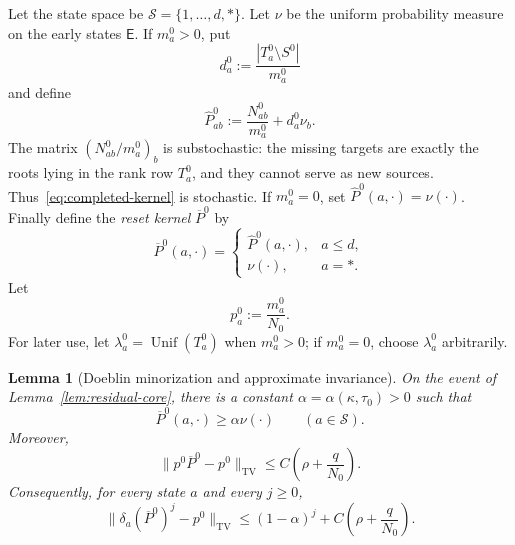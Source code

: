 \documentclass[11pt]{article}
\newcommand{\1}{\mathbf 1}
\newcommand{\TV}{\mathrm{TV}}
\newcommand{\Unif}{\operatorname{Unif}}
\newcommand{\cS}{\mathcal S}
\newtheorem{lemma}[theorem]{Lemma}
\theoremstyle{definition}
\theoremstyle{remark}
\begin{document}
Let the state space be $\cS=\{1,\dots,d,*\}$.  Let $\nu$ be the uniform
probability measure on the early states $\mathsf E$.  If $m_a^0>0$, put
\[
 d_a^0:=\frac{|T_a^0\setminus S^0|}{m_a^0}
\]
and define
\begin{equation}\label{eq:completed-kernel}
  \widehat P^0_{ab}
  :=\frac{N_{ab}^0}{m_a^0}+d_a^0\nu_b.
\end{equation}
The matrix $(N_{ab}^0/m_a^0)_b$ is substochastic: the missing targets are
exactly the roots lying in the rank row $T_a^0$, and they cannot serve as
new sources.  Thus~\eqref{eq:completed-kernel} is stochastic.  If
$m_a^0=0$, set $\widehat P^0(a,\cdot)=\nu(\cdot)$.  Finally define the
\emph{reset kernel} $\overline P^0$ by
\begin{equation}\label{eq:reset-kernel}
  \overline P^0(a,\cdot)=
  \begin{cases}
    \widehat P^0(a,\cdot),&a\leq d,\\
    \nu(\cdot),&a=*.
  \end{cases}
\end{equation}
Let
\begin{equation}\label{eq:p0-def}
  p_a^0:=\frac{m_a^0}{N_0}.
\end{equation}
For later use, let $\lambda_a^0=\Unif(T_a^0)$ when $m_a^0>0$; if
$m_a^0=0$, choose $\lambda_a^0$ arbitrarily.

\begin{lemma}[Doeblin minorization and approximate invariance]
\label{lem:reset-mixing}
On the event of Lemma~\ref{lem:residual-core}, there is a constant
$\alpha=\alpha(\kappa,\tau_0)>0$ such that
\begin{equation}\label{eq:global-minorization}
  \overline P^0(a,\cdot)\geq\alpha\nu(\cdot)
  \qquad(a\in\cS).
\end{equation}
Moreover,
\begin{equation}\label{eq:approx-invariance}
  \|p^0\overline P^0-p^0\|_{\TV}
  \leq C\left(\rho+\frac{q}{N_0}\right).
\end{equation}
Consequently, for every state $a$ and every $j\geq0$,
\begin{equation}\label{eq:reset-mixing-bound}
 \|\delta_a(\overline P^0)^j-p^0\|_{\TV}
 \leq
 (1-\alpha)^j
 +C\left(\rho+\frac{q}{N_0}\right).
\end{equation}
\end{lemma}
\end{document}
